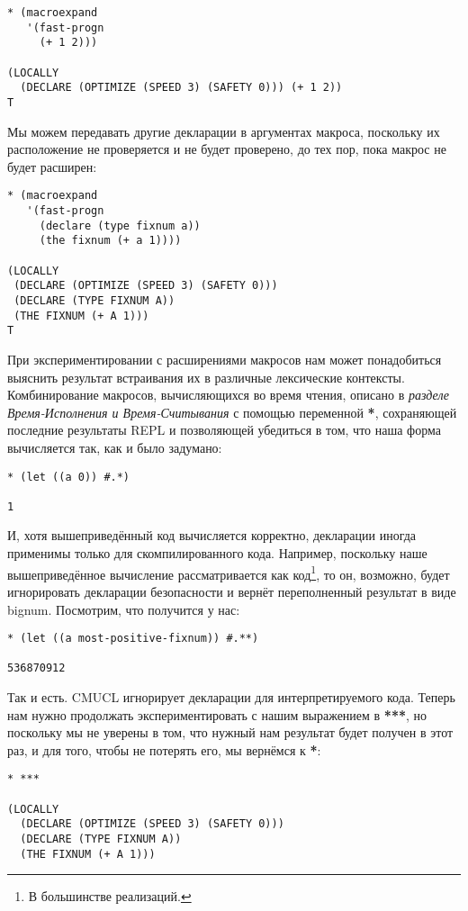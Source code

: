 \begin{verbatim}
* (macroexpand
   '(fast-progn
     (+ 1 2)))

(LOCALLY
  (DECLARE (OPTIMIZE (SPEED 3) (SAFETY 0))) (+ 1 2))
T
\end{verbatim}

Мы можем передавать другие декларации в аргументах макроса, поскольку их расположение не проверяется и не будет проверено, до тех пор, пока макрос не будет расширен:

\begin{verbatim}
* (macroexpand
   '(fast-progn
     (declare (type fixnum a))
     (the fixnum (+ a 1))))

(LOCALLY
 (DECLARE (OPTIMIZE (SPEED 3) (SAFETY 0)))
 (DECLARE (TYPE FIXNUM A))
 (THE FIXNUM (+ A 1)))
T
\end{verbatim}

При экспериментировании с расширениями макросов нам может понадобиться выяснить результат встраивания их в различные лексические контексты. Комбинирование макросов, вычисляющихся во время чтения, описано в \emph{разделе Время-Исполнения и Время-Считывания} с помощью переменной \textbf{*}, сохраняющей последние результаты REPL и позволяющей убедиться в том, что наша форма вычисляется так, как и было задумано:

\begin{verbatim}
* (let ((a 0)) #.*)

1
\end{verbatim}

И, хотя вышеприведённый код вычисляется корректно, декларации иногда применимы только для скомпилированного кода. Например, поскольку наше вышеприведённое вычисление рассматривается как код\footnote{В большинстве реализаций.}, то он, возможно, будет игнорировать декларации безопасности и вернёт переполненный результат в виде bignum. Посмотрим, что получится у нас:

\begin{verbatim}
* (let ((a most-positive-fixnum)) #.**)

536870912
\end{verbatim}

Так и есть. CMUCL игнорирует декларации для интерпретируемого кода. Теперь нам нужно продолжать экспериментировать с нашим выражением в \textbf{***}, но поскольку мы не уверены в том, что нужный нам результат будет получен в этот раз, и для того, чтобы не потерять его, мы вернёмся к \textbf{*}:

\begin{verbatim}
* ***

(LOCALLY
  (DECLARE (OPTIMIZE (SPEED 3) (SAFETY 0)))
  (DECLARE (TYPE FIXNUM A))
  (THE FIXNUM (+ A 1)))
\end{verbatim}

